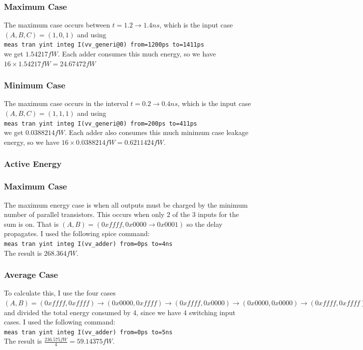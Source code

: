 \documentclass{article}
\def\code#1{\texttt{#1}}
\begin{document}
\subsubsection*{Maximum Case}
The maximum case occurs between $t = 1.2 \rightarrow 1.4ns$, which is the input case $(A, B, C) = (1,0,1)$ and using\\
\code{meas tran yint integ I(vv\_generi@0) from=1200ps to=1411ps}\\
we get $1.54217fW$. Each adder consumes this much energy, so we have $16 \times 1.54217fW = 24.67472fW$

\subsubsection*{Minimum Case}
The maximum case occurs in the interval $t = 0.2 \rightarrow 0.4ns$, which is the input case $(A, B, C) = (1,1,1)$ and using\\
\code{meas tran yint integ I(vv\_generi@0) from=200ps to=411ps}\\
we get $0.0388214fW$. Each adder also consumes this much minimum case leakage energy, so we have $16 \times 0.0388214fW = 0.6211424fW$. 

\subsubsection{Active Energy}

\subsubsection*{Maximum Case}
The maximum energy case is when all outputs must be charged by the minimum number of parallel transistors. This occurs when only 2 of the 3 inputs for the sum is on. That is $(A, B) = (0xffff, 0x0000 \rightarrow 0x0001)$ so the delay propagates. 
I used the following spice command:\\
\code{meas tran yint integ I(vv\_adder) from=0ps to=4ns}\\
The result is $268.364fW$. 

\subsubsection*{Average Case}
To calculate this, I use the four cases $(A, B) =  (0xffff, 0xffff) \rightarrow (0x0000, 0xffff) \rightarrow (0xffff, 0x0000) \rightarrow (0x0000, 0x0000) \rightarrow (0xffff, 0xffff)$ and divided the total energy consumed by 4, since we have 4 switching input cases. I used the following command: \\
\code{meas tran yint integ I(vv\_adder) from=0ps to=5ns}\\
The result is $\frac{236.575fW}{4} = 59.14375fW$. 
\end{document}
